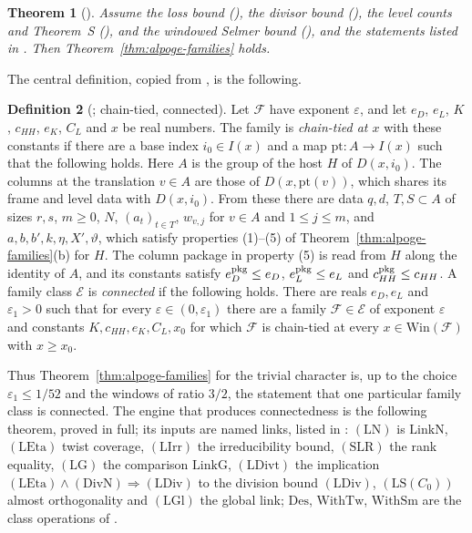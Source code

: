 \documentclass[10pt]{amsart}
\newtheorem{theorem}{Theorem}[section]
\theoremstyle{definition}
\newtheorem{definition}[theorem]{Definition}
\theoremstyle{remark}
\begin{document}
\begin{theorem}[{\cite[Theorem~\ref{A-i4:thm-final}]{Annex}}]\label{inp:thm-final}
Assume the loss bound \textup{(}\cite[Proposition~\ref{A-i4:hyp-loss}]{Annex}\textup{)}, the divisor bound
\textup{(}\cite[Proposition~\ref{A-i4:hyp-div}]{Annex}\textup{)}, the level counts and Theorem~S
\textup{(}\cite[Proposition~\ref{A-i4:hyp-S}]{Annex}\textup{)}, and the windowed Selmer bound
\textup{(}\cite[Proposition~\ref{A-i4:hyp-selmer}]{Annex}\textup{)}, and the statements listed in
\cite[Remark~\ref{A-i4:rem-trust}]{Annex}. Then Theorem~\ref{thm:alpoge-families}
holds.
\end{theorem}

The central definition, copied from \cite{Annex}, is the following.

\begin{definition}[{\cite[Definition~\ref{A-i4:def-chain}]{Annex}}; chain-tied, connected]\label{inp:def-chain}
Let $\mathcal F$ have exponent $\varepsilon$, and let
$e_D$, $e_L$, $K$, $c_{HH}$, $e_K$, $C_L$ and $x$ be real numbers. The family is \emph{chain-tied at $x$}
with these constants if there are a base index $i_0\in I(x)$ and a map
$\mathrm{pt}:A\to I(x)$ such that the following holds. Here $A$ is the
group of the host $H$ of $D(x,i_0)$. The columns at the translation
$v\in A$ are those of $D(x,\mathrm{pt}(v))$, which shares its frame and
level data with $D(x,i_0)$. From these there are data $q,d$, $T,S\subset A$
of sizes $r,s$, $m\ge0$, $N$, $(a_t)_{t\in T}$, $w_{v,j}$ for $v\in A$ and
$1\le j\le m$, and $a,b,b',k,\eta,X',\vartheta$, which satisfy properties
(1)--(5) of Theorem~\ref{thm:alpoge-families}(b) for $H$. The column
package in property (5) is read from $H$ along the identity of $A$, and its
constants satisfy $e_D^{\rm pkg}\le e_D$, $e_L^{\rm pkg}\le e_L$ and
$c_{HH}^{\rm pkg}\le c_{HH}$. A family class $\mathcal E$ is
\emph{connected} if the following holds. There are reals $e_D,e_L$ and
$\varepsilon_1>0$ such that for every $\varepsilon\in(0,\varepsilon_1)$
there are a family $\mathcal F\in\mathcal E$ of exponent $\varepsilon$ and
constants $K,c_{HH},e_K,C_L,x_0$ for which $\mathcal F$ is chain-tied at
every $x\in\mathrm{Win}(\mathcal F)$ with $x\ge x_0$.
\end{definition}

\noindent Thus Theorem~\ref{thm:alpoge-families} for the trivial character
is, up to the choice $\varepsilon_1\le1/52$ and the windows of ratio $3/2$,
the statement that one particular family class is connected. The engine
that produces connectedness is the following theorem, proved in full; its
inputs are named links, listed in \cite[\S\ref{A-i4:ssec-hyps}]{Annex}:
$(\mathrm{LN})$ is $\mathrm{LinkN}$, $(\mathrm{LEta})$ twist coverage,
$(\mathrm{LIrr})$ the irreducibility bound, $(\mathrm{SLR})$ the rank
equality, $(\mathrm{LG})$ the comparison $\mathrm{LinkG}$,
$(\mathrm{LDivt})$ the implication
$(\mathrm{LEta})\wedge(\mathrm{DivN})\Rightarrow(\mathrm{LDiv})$ to the
division bound $(\mathrm{LDiv})$, $(\mathrm{LS}(C_0))$ almost
orthogonality and $(\mathrm{LGl})$ the global link; $\mathrm{Des}$,
$\mathrm{WithTw}$, $\mathrm{WithSm}$ are the class operations of
\cite[\S\ref{A-i4:ssec-desWin}]{Annex}.
\end{document}
